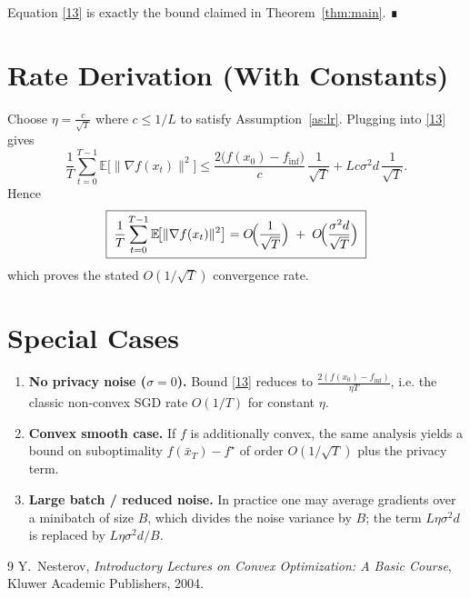 \documentclass[11pt]{article}
\newcommand{\E}{\mathbb{E}}
\begin{document}
Equation \eqref{13} is exactly the bound claimed in Theorem~\ref{thm:main}. ∎

\section*{Rate Derivation (With Constants)}
Choose $\eta = \frac{c}{\sqrt{T}}$ where $c\le 1/L$ to satisfy Assumption~\ref{as:lr}. Plugging into \eqref{13} gives
\[
\frac{1}{T}\sum_{t=0}^{T-1}\E\!\bigl[\|\nabla f(x_t)\|^{2}\bigr]
\le \frac{2\bigl(f(x_0)-f_{\inf}\bigr)}{c}\,\frac{1}{\sqrt{T}}
+ Lc\sigma^{2}d\,\frac{1}{\sqrt{T}} .
\]
Hence
\[
\boxed{\;
\frac{1}{T}\sum_{t=0}^{T-1}\E\!\bigl[\|\nabla f(x_t)\|^{2}\bigr]
= O\!\Bigl(\frac{1}{\sqrt{T}}\Bigr)
\;+\;
O\!\Bigl(\frac{\sigma^{2}d}{\sqrt{T}}\Bigr)
\;}
\]
which proves the stated $O(1/\sqrt{T})$ convergence rate.

\section*{Special Cases}
\begin{enumerate}[label=\arabic*)]
    \item \textbf{No privacy noise ($\sigma=0$).}  
    Bound \eqref{13} reduces to $\frac{2(f(x_0)-f_{\inf})}{\eta T}$, i.e. the classic non‑convex SGD rate $O(1/T)$ for constant $\eta$.
    \item \textbf{Convex smooth case.}  
    If $f$ is additionally convex, the same analysis yields a bound on suboptimality $f(\bar x_T)-f^\star$ of order $O(1/\sqrt{T})$ plus the privacy term.
    \item \textbf{Large batch / reduced noise.}  
    In practice one may average gradients over a minibatch of size $B$, which divides the noise variance by $B$; the term $L\eta\sigma^{2}d$ is replaced by $L\eta\sigma^{2}d/B$.
\end{enumerate}

\begin{thebibliography}{9}
Y.~Nesterov, \emph{Introductory Lectures on Convex Optimization: A Basic Course}, Kluwer Academic Publishers, 2004.
\end{thebibliography}
\end{document}
